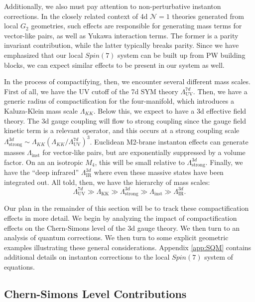 \documentclass[12pt]{article}%
\numberwithin{equation}{section}
\renewcommand{\(}{\left(}
\renewcommand{\)}{\right)}
\renewcommand{\[}{\left[}
\renewcommand{\]}{\right]}
\begin{document}
Additionally, we also must pay attention to non-perturbative instanton corrections. In the closely related context of 4d $\mathcal{N} = 1$ theories generated from local $G_2$ geometries, such effects are responsible for generating mass terms for vector-like pairs, as well as Yukawa interaction terms. The former is a parity invariant contribution, while the latter typically breaks parity. Since we have emphasized that our local $Spin(7)$ system can be built up from PW building blocks, we can expect similar effects to be present in our system as well.

In the process of compactifying, then, we encounter several different mass scales. First of all, we have the UV cutoff of the 7d SYM theory $\Lambda_{\mathrm{UV}}^{7d}$. Then, we have a generic radius of compactification for the four-manifold, which introduces a Kaluza-Klein mass scale $\Lambda_{KK}$. Below this, we expect to have a 3d effective field theory. The 3d gauge coupling will flow to strong coupling since the gauge field kinetic term is a relevant operator, and this occurs at a strong coupling scale $\Lambda_{\mathrm{strong}}^{3d} \sim \Lambda_{KK} (\Lambda_{KK}/\Lambda_{\mathrm{UV}}^{7d})^3 $. Euclidean M2-brane instanton effects can generate masses $\Lambda_{\mathrm{inst}}$
for vector-like pairs, but are exponentially suppressed by a volume factor. On an an isotropic $M_4$, this will be small relative to $\Lambda_{\mathrm{strong}}^{3d} $.
Finally, we have the ``deep infrared'' $\Lambda_{\mathrm{IR}}^{3d}$ where even these massive states have been integrated out.
All told, then, we have the hierarchy of mass scales:
\begin{equation}
\Lambda_{\mathrm{UV}}^{7d} \gg \Lambda_{\mathrm{KK}} \gg \Lambda_{\mathrm{strong}}^{3d} \gg \Lambda_{\mathrm{inst}} \gg \Lambda_{\mathrm{IR}}^{3d}.
\end{equation}

Our plan in the remainder of this section will be to track these compactification effects in more detail. We begin by analyzing
the impact of compactification effects on the Chern-Simons level of the 3d gauge theory. We then turn to an analysis of
quantum corrections. We then turn to some explicit geometric examples illustrating these general
considerations. Appendix \ref{app:SQM} contains additional details on instanton corrections to the local $Spin(7)$ system of equations.

\subsection{Chern-Simons Level Contributions}
\end{document}
